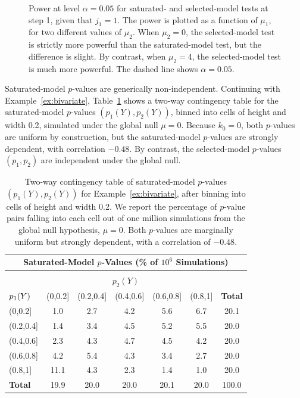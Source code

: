 \documentclass{article}
\begin{document}
\begin{figure}
\begin{subfigure}[t]{.4\textwidth}
  \end{subfigure}
  \caption{Power at level $\alpha=0.05$ for saturated- and selected-model tests at step 1, given that $j_1=1$. The power is plotted as a function of $\mu_1$, for two different values of $\mu_2$. When $\mu_2=0$, the selected-model test is strictly more powerful than the saturated-model test, but the difference is slight. By contrast, when $\mu_2=4$, the selected-model test is much more powerful. The dashed line shows $\alpha=0.05$.}
   \label{fig:bv_powCurves}
\end{figure}

Saturated-model $p$-values are generically non-independent. Continuing with Example~\ref{ex:bivariate}, Table~\ref{tab:bv_twoWayTable} shows a two-way contingency table for the saturated-model $p$-values $(p_1(Y), p_2(Y))$, binned into cells of height and width 0.2, simulated under the global null $\mu=0$. Because $k_0=0$, both $p$-values are uniform by construction, but the saturated-model $p$-values are strongly dependent, with correlation $-0.48$. By contrast, the selected-model $p$-values $(p_1,p_2)$ are independent under the global null.

\begin{table}[ht]
  \centering
  \begin{tabular}{l|ccccc|c}
    \multicolumn{7}{c}{Saturated-Model $p$-Values 
      (\% of $10^6$ Simulations)}\\[7pt]
    \hline
    \multicolumn{7}{c}{}\\[-1.5ex]
    \multicolumn{7}{c}{$p_2(Y)$}\\[5pt]
    ${\large p_1(Y)}$ & (0,0.2] & (0.2,0.4] & (0.4,0.6] & (0.6,0.8] & (0.8,1] & \textbf{Total} \\ 
    \hline
    (0,0.2] & 1.0 & 2.7 & 4.2 & 5.6 & 6.7 & 20.1 \\ 
    (0.2,0.4] & 1.4 & 3.4 & 4.5 & 5.2 & 5.5 & 20.0 \\ 
    (0.4,0.6] & 2.3 & 4.3 & 4.7 & 4.5 & 4.2 & 20.0 \\ 
    (0.6,0.8] & 4.2 & 5.4 & 4.3 & 3.4 & 2.7 & 20.0 \\ 
    (0.8,1] & 11.1 & 4.3 & 2.3 & 1.4 & 1.0 & 20.0 \\ 
    \hline
    \textbf{Total} & 19.9 & 20.0 & 20.0 & 20.1 & 20.0 & 100.0 \\ 
    \hline
  \end{tabular}
  \caption{Two-way contingency table of saturated-model $p$-values $(p_1(Y), p_2(Y))$ for Example~\ref{ex:bivariate}, after binning into cells of height and width 0.2. We report the percentage of $p$-value pairs falling into each cell out of one million simulations from the global null hypothesis, $\mu=0$. Both $p$-values are marginally uniform but strongly dependent, with a correlation of $-0.48$.}
\label{tab:bv_twoWayTable}
\end{table}
\end{document}
